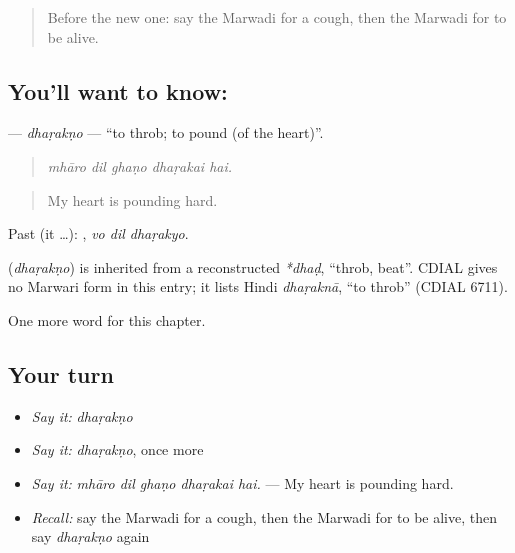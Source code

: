 \label{lesson:MW-C253-dharakno}



\begin{quote}
Before the new one: say the Marwadi for a cough, then the Marwadi for to be alive.
\end{quote}

\subsection*{You'll want to know: }
\textbf{} — \emph{dhaṛakṇo} — \textquotedblleft{}to throb; to pound (of the heart)\textquotedblright{}.

\begin{quote}
    
\end{quote}

\begin{quote}
\emph{mhāro dil ghaṇo dhaṛakai hai.}
\end{quote}

\begin{quote}
My heart is pounding hard.
\end{quote}

Past (it …):   , \emph{vo dil dhaṛakyo}.

\begin{cousinweb}
\textbf{} (\emph{dhaṛakṇo}) is inherited from a reconstructed \emph{*dhaḍ}, \textquotedblleft{}throb, beat\textquotedblright{}. CDIAL gives no Marwari form in this entry; it lists Hindi \emph{dhaṛaknā}, \textquotedblleft{}to throb\textquotedblright{} (CDIAL 6711).
\end{cousinweb}

\begin{grammarlens}[title={What you've built}]
One more word for this chapter.
\end{grammarlens}

\subsection*{Your turn}
\begin{itemize}
\raggedright
  \item \emph{Say it:} \emph{dhaṛakṇo}
  \item \emph{Say it:} \emph{dhaṛakṇo}, once more
  \item \emph{Say it:} \emph{mhāro dil ghaṇo dhaṛakai hai.} — My heart is pounding hard.
  \item \emph{Recall:} say the Marwadi for a cough, then the Marwadi for to be alive, then say \emph{dhaṛakṇo} again
\end{itemize}

